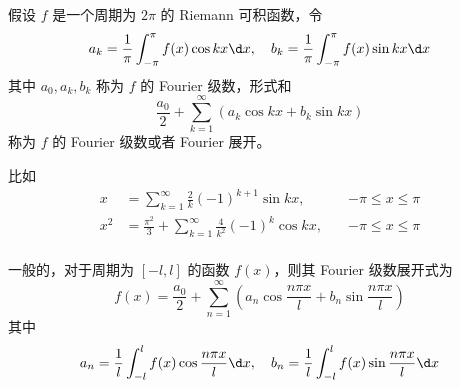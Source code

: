 \begin{definition}
	假设 $f$ 是一个周期为 $2\pi$ 的 Riemann 可积函数，令
	\[ a_k = \frac{1}{\pi} \int_{-\pi}^{\pi} f(x) \cos kx \d x, \quad b_k = \frac{1}{\pi} \int_{-\pi}^{\pi} f(x) \sin k x \d x \]
	其中 $a_0, a_k, b_k$ 称为 $f$ 的 Fourier 级数，形式和
	\[ \frac{a_0}{2} + \sum_{k=1}^\infty (a_k \cos k x+ b_k \sin k x) \]
	称为 $f$ 的 Fourier 级数或者 Fourier 展开。
\end{definition}

比如
\[ \begin{aligned}
		x   & = \sum_{k=1}^{\infty} \frac{2}{k} (-1)^{k+1} \sin k x, \quad                   & -\pi \leqslant x \leqslant \pi \\
		x^2 & = \frac{\pi^2}{3} + \sum_{k=1}^{\infty} \frac{4}{k^2} (-1)^{k} \cos k x, \quad & -\pi \leqslant x \leqslant \pi \\
	\end{aligned} \]

一般的，对于周期为 $[-l,l]$ 的函数 $f(x)$，则其 Fourier 级数展开式为
\[ f(x) = \frac{a_0}{2} + \sum_{n=1}^{\infty} \left( a_n \cos \frac{n \pi x}{l} + b_n \sin \frac{n \pi x}{l} \right) \]
其中
\[ a_n = \frac{1}{l} \int_{-l}^{l} f(x) \cos \frac{n \pi x}{l} \d x, \quad b_n = \frac{1}{l} \int_{-l}^{l} f(x) \sin \frac{n \pi x}{l} \d x  \]
